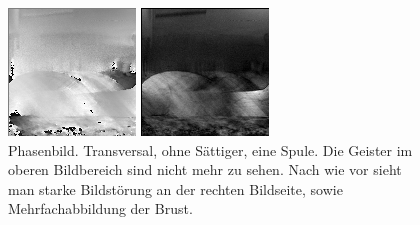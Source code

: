 \documentclass[
    11pt,
    ngerman
]{scrbook}
\begin{document}
\begin{figure}[htbp]
    \begin{minipage}[htbp]{.45\textwidth}
        \centering
        \includegraphics[width=.9\textwidth]{Abbildungen/2015-03-13_5_1.png}
        \caption{%
            Phasenbild. Transversal, ohne Sättiger, eine Spule. Die Geister im oberen Bildbereich sind nicht mehr zu sehen. Nach wie vor sieht man starke Bildstörung an der rechten Bildseite, sowie Mehrfachabbildung der Brust.
        }
        \label{fig:2015-03-13_5_1}
    \end{minipage}
    \hfill
    \begin{minipage}[htbp]{.45\textwidth}
        \centering
        \includegraphics[width=.9\textwidth]{Abbildungen/2015-03-13_4_1.png}

\end{minipage}
\end{figure}
\end{document}
